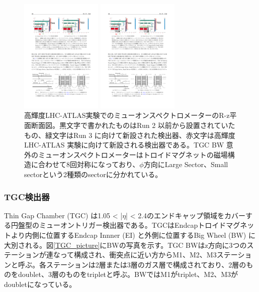 \begin{figure}
\begin{minipage}[b]{.5\linewidth}
\centering
\includegraphics[height=5.5cm]{fig/Intro/MuonSpe_Large.pdf}
\end{minipage}%
\begin{minipage}[b]{.5\linewidth}
\centering
\includegraphics[height=5.5cm]{fig/Intro/MuonSpe_small.pdf}
\end{minipage}%
\caption[異なる画像形式の比較]{高輝度LHC-ATLAS実験でのミューオンスペクトロメーターのR-z平面断面図\cite{tdr_phase2muon_2017017}。黒文字で書かれたものはRun 2 以前から設置されていたもの、緑文字はRun 3 に向けて新設された検出器、赤文字は高輝度LHC-ATLAS 実験に向けて新設される検出器である。TGC BW 意外のミューオンスペクトロメーターはトロイドマグネットの磁場構造に合わせて8回対称になっており、$\phi$方向にLarge Sector、Small sectorという2種類のsectorに分かれている。}
\label{fig_formats}
\end{figure}

\subsubsection*{TGC検出器}
Thin Gap Chamber  (TGC) は1.05 < |$\eta$| < 2.4のエンドキャップ領域をカバーする円盤型のミューオントリガー検出器である。TGCはEndcapトロイドマグネットより内側に位置するEndcap Innner  (EI) と外側に位置するBig Wheel  (BW) に大別される。図\ref{TGC_picture}にBWの写真を示す。TGC BWはz方向に3つのステーションが連なって構成され、衝突点に近い方からM1、M2、M3ステーションと呼ぶ。各ステーションは2層または3層のガス層で構成されており、2層のものをdoublet、3層のものをtripletと呼ぶ。BWではM1がtriplet、M2、M3がdoubletになっている。

